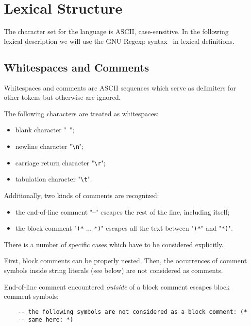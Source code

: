 \section{Lexical Structure}
\label{sec:lexical_structure}

The character set for the language is \textsc{ASCII}, case-sensitive. In the following lexical description we will use
the GNU Regexp syntax~\cite{GNULib} in lexical definitions.

\subsection{Whitespaces and Comments}

Whitespaces and comments are \textsc{ASCII} sequences which serve as delimiters for other tokens but otherwise are
ignored.

The following characters are treated as whitespaces:

\begin{itemize}
\item blank character "\texttt{ }";
\item newline character "\texttt{\textbackslash n}";
\item carriage return character "\texttt{\textbackslash r}";
\item tabulation character "\texttt{\textbackslash t}".
\end{itemize}

Additionally, two kinds of comments are recognized:

\begin{itemize}
\item the end-of-line comment "\texttt{--}" escapes the rest of the line, including itself;
\item the block comment "\texttt{(*} ... \texttt{*)}" escapes all the text between
  "\texttt{(*}" and "\texttt{*)}".
\end{itemize}

There is a number of specific cases which have to be considered explicitly.

First, block comments can be properly nested. Then, the occurrences of comment symbols inside string literals (see below) are not
considered as comments.

End-of-line comment encountered \emph{outside} of a block comment escapes block comment symbols:

\begin{lstlisting}
    -- the following symbols are not considered as a block comment: (*
    -- same here: *)
\end{lstlisting}

